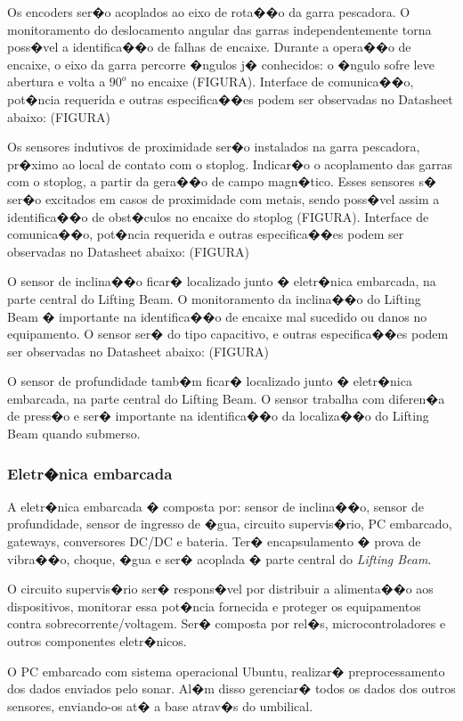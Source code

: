 Os encoders ser�o acoplados ao eixo de rota��o da garra pescadora. O monitoramento do deslocamento angular das garras independentemente torna poss�vel a identifica��o de falhas de encaixe. Durante a opera��o de encaixe, o eixo da garra percorre �ngulos j� conhecidos: o �ngulo sofre leve abertura e volta a $90^o$ no encaixe (FIGURA). Interface de comunica��o, pot�ncia requerida e outras especifica��es podem ser observadas no Datasheet abaixo: (FIGURA)

Os sensores indutivos de proximidade ser�o instalados na garra pescadora, pr�ximo ao local de contato com o stoplog. Indicar�o o acoplamento das garras com o stoplog, a partir da gera��o de campo magn�tico. Esses sensores s� ser�o excitados em casos de proximidade com metais, sendo poss�vel assim a identifica��o de obst�culos no encaixe do stoplog (FIGURA). Interface de comunica��o, pot�ncia requerida e outras especifica��es podem ser observadas no Datasheet abaixo: (FIGURA)

O sensor de inclina��o ficar� localizado junto � eletr�nica embarcada, na parte central do Lifting Beam. O monitoramento da inclina��o do Lifting Beam � importante na identifica��o de encaixe mal sucedido ou danos no equipamento. O sensor ser� do tipo capacitivo, e outras especifica��es podem ser observadas no Datasheet abaixo: (FIGURA)

O sensor de profundidade tamb�m ficar� localizado junto � eletr�nica embarcada,
na parte central do Lifting Beam. O sensor trabalha com diferen�a de press�o e ser� importante na identifica��o da localiza��o do Lifting Beam quando submerso.

\subsubsection{Eletr�nica embarcada}
A eletr�nica embarcada � composta por: sensor de inclina��o, sensor de
profundidade, sensor de ingresso de �gua, circuito supervis�rio, PC embarcado,
gateways, conversores DC/DC e bateria. Ter� encapsulamento � prova de vibra��o,
choque, �gua e ser� acoplada � parte central do \emph{Lifting Beam}.

O circuito supervis�rio ser� respons�vel por distribuir a alimenta��o aos
dispositivos, monitorar essa pot�ncia fornecida e proteger os equipamentos
contra sobrecorrente/voltagem. Ser� composta por rel�s, microcontroladores e
outros componentes eletr�nicos.

O PC embarcado com sistema operacional Ubuntu, realizar� preprocessamento dos
dados enviados pelo sonar. Al�m disso gerenciar� todos os dados dos outros
sensores, enviando-os at� a base atrav�s do umbilical.

